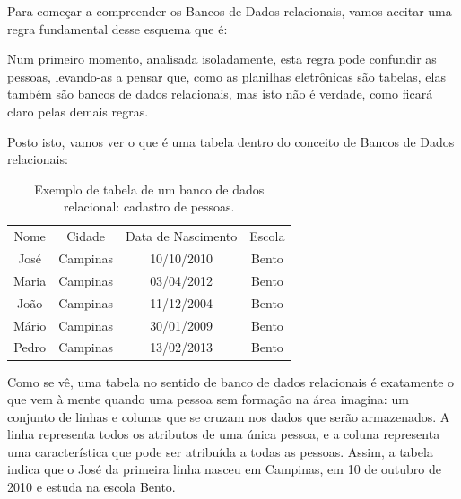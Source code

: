 Para começar a compreender os Bancos de Dados relacionais, vamos aceitar uma regra fundamental desse esquema que é:


\noindent\begin{center}\mbox{\centering{}}\end{center}


Num primeiro momento, analisada isoladamente, esta regra pode confundir as pessoas, levando-as a pensar que, como as planilhas eletrônicas são tabelas, elas também são bancos de dados relacionais, mas isto não é verdade, como ficará claro pelas demais regras.

Posto isto, vamos ver o que é uma tabela dentro do conceito de Bancos de Dados relacionais:





\begin{table}[htb]
\tiny
\caption{\label{19e28cfdeba98e03e062e9c442b749a7cc006c08}Exemplo de tabela de um banco de dados relacional: cadastro de pessoas.}

\centering
\begin{tabular}{|c|c|c|c|}
\hline
Nome  &  Cidade  &  Data de Nascimento  &  Escola \\
José  &  Campinas  &  10/10/2010  &  Bento \\
Maria  &  Campinas  &  03/04/2012  &  Bento \\
João  &  Campinas  &  11/12/2004  &  Bento \\
Mário  &  Campinas  &  30/01/2009  &  Bento \\
Pedro  &  Campinas  &  13/02/2013  &  Bento \\
\hline
\end{tabular}
\end{table}


Como se vê, uma tabela no sentido de banco de dados relacionais é exatamente o que vem à mente quando uma pessoa sem formação na área imagina: um conjunto de linhas e colunas que se cruzam nos dados que serão armazenados. A linha representa todos os atributos de uma única pessoa, e a coluna representa uma característica que pode ser atribuída a todas as pessoas. Assim, a tabela indica que o  José da primeira linha nasceu em Campinas, em 10 de outubro de 2010 e estuda na escola Bento.

